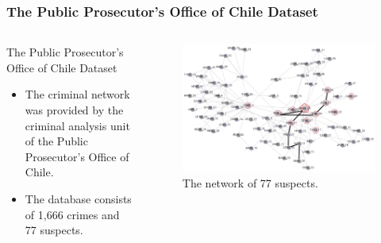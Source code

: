 \documentclass[aspectratio=169]{beamer}
\begin{document}
\begin{frame}
\frametitle{The Public Prosecutor’s Office of Chile Dataset}
\begin{columns}
  \begin{block}{The Public Prosecutor’s Office of Chile Dataset}
    \begin{itemize}
      \item The criminal network was provided by the criminal analysis unit of the Public Prosecutor’s Office of Chile.
      \item The database consists of 1,666 crimes and 77 suspects.
    \end{itemize}
  \end{block}
    \begin{figure}[ht]
      \centering
      \includegraphics[width=\textwidth]{images/network.pdf}
      \caption{\footnotesize The network of 77 suspects.}
    \end{figure}
  \end{columns}
\end{frame}
\end{document}
